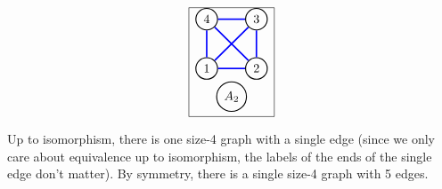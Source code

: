 \[
    \begin{array}{|l|}
    \hline
    \begin{tikzpicture}
[scale=.2]
\begin{scope}[every node/.style={circle,thick,draw}]
    \node (1) at (0,4) {1};
    \node (2) at (7,4) {2};
    \node (3) at (7,11) {3};
    \node (4) at (0,11) {4};
   \node(A) at (3.5,0) {$A_2$};
\end{scope}

\begin{scope}[%
              every node/.style={fill=white,circle},
              every edge/.style={draw=blue,very thick}]
     \draw (1) edge  (2);
     \draw (2) edge  (3);
     \draw (3) edge  (4);
     \draw (4) edge  (1);
     \draw (4) edge  (2);
     \draw (3) edge  (1);
             
\end{scope}
\end{tikzpicture}\\
\hline
\end{array}
\]

Up to isomorphism, there is one size-4 graph with a single edge (since we only care about equivalence up to isomorphism, the labels of the ends of the single edge don't matter). By symmetry, there is a single size-4 graph with 5 edges. 

